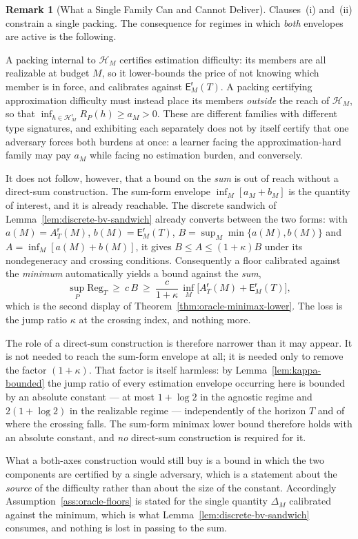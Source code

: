 \documentclass[12pt]{article}
\theoremstyle{definition}
\newtheorem{remark}[theorem]{Remark}
\newcommand{\Hcal}{\mathcal H}
\newcommand{\Reg}{\mathrm{Reg}}
\newcommand{\Est}{\mathsf E}
\newcommand{\Aapp}{A_T}
\begin{document}
\begin{remark}[What a Single Family Can and Cannot Deliver]
\label{rem:floors-two-axes}
Clauses~(i) and~(ii) constrain a single packing.  The consequence for regimes
in which \emph{both} envelopes are active is the following.

A packing internal to $\mathcal H_M$ certifies estimation difficulty: its
members are all realizable at budget $M$, so it lower-bounds the price of not
knowing which member is in force, and calibrates against
$\Est_M^{\mathsf r}(T)$.  A packing certifying approximation difficulty must
instead place its members \emph{outside} the reach of $\mathcal H_M$, so that
$\inf_{h\in\Hcal_M^{\mathsf r}}R_P(h)\ge a_M>0$.  These are different families
with different type signatures, and exhibiting each separately does not by
itself certify that one adversary forces both burdens at once: a learner facing
the approximation-hard family may pay $a_M$ while facing no estimation burden,
and conversely.

It does not follow, however, that a bound on the \emph{sum} is out of reach
without a direct-sum construction.  The sum-form envelope $\inf_M[a_M+b_M]$ is
the quantity of interest, and it is already reachable.  The discrete
sandwich of Lemma~\ref{lem:discrete-bv-sandwich} already converts between the
two forms: with $a(M)=\Aapp^{\mathsf r}(M)$, $b(M)=\Est_M^{\mathsf r}(T)$,
$B=\sup_M\min\{a(M),b(M)\}$ and $A=\inf_M[a(M)+b(M)]$, it gives
$B\le A\le(1+\kappa)B$ under its nondegeneracy and crossing conditions.
Consequently a floor calibrated against the \emph{minimum} automatically yields
a bound against the \emph{sum},
\[
\sup_P\Reg_T\ \ge\ c\,B\ \ge\ \frac{c}{1+\kappa}\,\inf_{M}\bigl[
\Aapp^{\mathsf r}(M)+\Est_M^{\mathsf r}(T)\bigr],
\]
which is the second display of Theorem~\ref{thm:oracle-minimax-lower}.  The
loss is the jump ratio $\kappa$ at the crossing index, and nothing more.

The role of a direct-sum construction is therefore narrower than it may appear.
It is not needed to reach the sum-form envelope at all; it is needed only to
remove the factor $(1+\kappa)$.  That factor is itself harmless:
by Lemma~\ref{lem:kappa-bounded} the jump ratio of every estimation envelope
occurring here is bounded by an absolute constant --- at most $1+\log2$ in the
agnostic regime and $2(1+\log2)$ in the realizable regime --- independently of
the horizon $T$ and of where the crossing falls.  The sum-form minimax lower
bound therefore holds with an absolute constant, and \emph{no} direct-sum
construction is required for it.

What a both-axes construction would still buy is a bound in which the two
components are certified by a single adversary, which is a statement about the
\emph{source} of the difficulty rather than about the size of the constant.
Accordingly Assumption~\ref{ass:oracle-floors} is stated for the single
quantity $\Delta_M$ calibrated against the minimum, which is what
Lemma~\ref{lem:discrete-bv-sandwich} consumes, and nothing is lost in passing
to the sum.
\end{remark}
\end{document}
